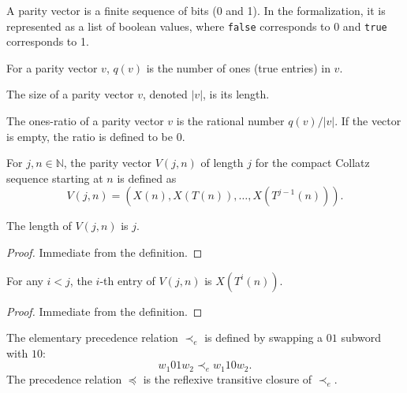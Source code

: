 \begin{definition}\label{def:ParityVector}\leanok
A parity vector is a finite sequence of bits (0 and 1). In the formalization, it is represented as a list of boolean values, where \texttt{false} corresponds to 0 and \texttt{true} corresponds to 1.
\end{definition}

\begin{definition}\label{def:ParityVector_q}\leanok
For a parity vector $v$, $q(v)$ is the number of ones (true entries) in $v$.
\end{definition}

\begin{definition}\label{def:ParityVector_size}\leanok
The size of a parity vector $v$, denoted $|v|$, is its length.
\end{definition}

\begin{definition}\label{def:ParityVector_onesRatio}\leanok
The ones-ratio of a parity vector $v$ is the rational number $q(v) / |v|$. If the vector is empty, the ratio is defined to be 0.
\end{definition}

\begin{definition}\label{def:ParityVector_V}\leanok
For $j, n \in \mathbb{N}$, the parity vector $V(j, n)$ of length $j$ for the compact Collatz
sequence starting at $n$ is defined as
\[
    V(j, n) = (X(n), X(T(n)), \dots, X(T^{j-1}(n))).
\]
\end{definition}

\begin{lemma}\label{lemma:V_length}\leanok
The length of $V(j, n)$ is $j$.
\end{lemma}
\begin{proof}\leanok
Immediate from the definition.
\end{proof}

\begin{lemma}\label{lemma:V_get}\leanok
For any $i < j$, the $i$-th entry of $V(j, n)$ is $X(T^i(n))$.
\end{lemma}
\begin{proof}\leanok
Immediate from the definition.
\end{proof}

\begin{definition}\label{def:ParityVector_Precedes}\leanok
The elementary precedence relation $\prec_e$ is defined by swapping a $01$ subword with $10$:
\begin{equation}
    w_1 01 w_2 \prec_e w_1 10 w_2.
\end{equation}
The precedence relation $\preceq$ is the reflexive transitive closure of $\prec_e$.
\end{definition}

